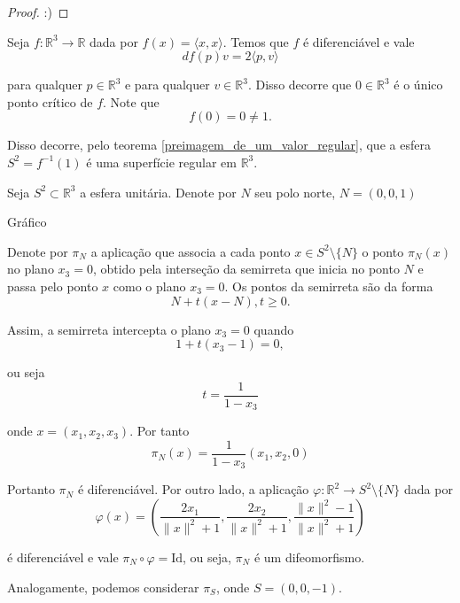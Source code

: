 \begin{proof}
:)
\end{proof}

\begin{exemplo}
Seja $f: \mathbb{R}^3 \rightarrow \mathbb{R}$ dada por $f(x) = \langle x,x \rangle$. Temos que $f$ é diferenciável e vale
\begin{equation*}
    df(p)v = 2 \langle p,v \rangle
\end{equation*}

para qualquer $p \in \mathbb{R}^3$ e para qualquer $v \in \mathbb{R}^3$. Disso decorre que $0 \in \mathbb{R}^3$ é o único ponto crítico de $f$. Note que
\begin{equation*}
    f(0) = 0 \neq 1.
\end{equation*}

Disso decorre, pelo teorema \ref{preimagem_de_um_valor_regular}, que a esfera $S^2 = f^{-1}(1)$ é uma superfície regular em $\mathbb{R}^3$.
\end{exemplo}

\begin{exemplo}
Seja $S^2 \subset \mathbb{R}^3$ a esfera unitária. Denote por $N$ seu polo norte, $N = (0,0,1)$

Gráfico

Denote por $\pi_N$ a aplicação que associa a cada ponto $x \in S^2 \setminus \{N\}$ o ponto $\pi_N(x)$ no plano $x_3 = 0$, obtido pela interseção da semirreta que inicia no ponto $N$ e passa pelo ponto $x$ como o plano $x_3 = 0$. Os pontos da semirreta são da forma
\begin{equation*}
    N + t(x - N), t \geq 0.
\end{equation*}

Assim, a semirreta intercepta o plano $x_3 = 0$ quando
\begin{equation*}
    1 + t(x_3 - 1) = 0,
\end{equation*}

ou seja
\begin{equation*}
    t = \frac{1}{1 - x_3}
\end{equation*}

onde $x = (x_1, x_2, x_3)$. Por tanto
\begin{equation*}
    \pi_N(x) = \frac{1}{1-x_3} (x_1, x_2, 0)
\end{equation*}

Portanto $\pi_N$ é diferenciável. Por outro lado, a aplicação $\varphi: \mathbb{R}^2 \rightarrow S^2 \setminus \{N\}$ dada por
\begin{equation*}
	\varphi(x) = \left( \frac{2x_1}{\|x\|^2 + 1}, \frac{2x_2}{\|x\|^2 +1}, \frac{\|x\|^2 -1}{\|x\|^2 +1} \right)
\end{equation*} 

é diferenciável e vale $\pi_N \circ \varphi = \text{Id}$, ou seja, $\pi_N$ é um difeomorfismo.

Analogamente, podemos considerar $\pi_S$, onde $S=(0,0,-1)$.
\end{exemplo}

